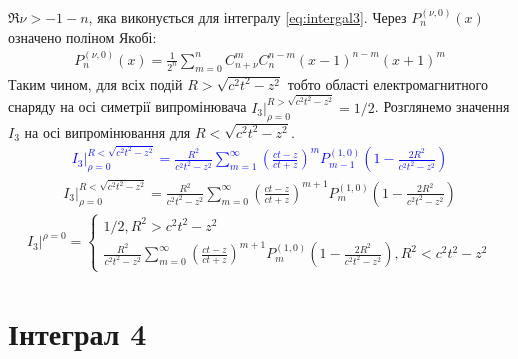 $ \Re \nu > - 1 - n $, яка виконується для інтегралу \eqref{eq:intergal3}. 
Через $ P_n^{(\nu,0)} (x) $ означено поліном Якобі:
%
\begin{equation*} \begin{aligned}
P_n^{(\nu,0)} (x) = \frac{1}{2^n} \sum_{m=0}^{n} C_{n+\nu}^{m} C_{n}^{n-m} 
\left( x - 1 \right)^{n-m} \left( x + 1 \right)^m 
\end{aligned} \end{equation*}
%
Таким чином, для всіх подій $ R > \sqrt{c^2 t^2 - z^2} $ тобто області 
електромагнитного снаряду на осі симетрії випромінювача 
$ \left. I_3 \right|_{\rho = 0}^{R > \sqrt{c^2 t^2 - z^2}} = 1/2 $. Розглянемо 
значення $ I_3 $ на осі випромінювання для $ R < \sqrt{c^2 t^2 - z^2} $.
%
\textcolor{blue}{ \begin{equation*} \begin{aligned}
\left. I_3 \right|_{\rho = 0}^{R < \sqrt{c^2 t^2 - z^2}} = 
\frac{R^2}{c^2 t^2 - z^2} \sum_{m=1}^{\infty} 
\left( \frac{ct - z}{ct + z} \right)^m P_{m-1}^{(1,0)} 
\left( 1 - \frac{2R^2}{c^2 t^2 - z^2} \right)
\end{aligned} \end{equation*} }
%
\begin{equation*} \begin{aligned}
\left. I_3 \right|_{\rho = 0}^{R < \sqrt{c^2 t^2 - z^2}} = 
\frac{R^2}{c^2 t^2 - z^2} \sum_{m=0}^{\infty} 
\left( \frac{ct - z}{ct + z} \right)^{m+1} P_{m}^{(1,0)} 
\left( 1 - \frac{2R^2}{c^2 t^2 - z^2} \right)
\end{aligned} \end{equation*}
%
\begin{equation} \begin{aligned} \label{eq:i3onaxis}
\left. I_3 \right|^{\rho = 0} = \begin{cases} 1/2, R^2 > c^2 t^2 - z^2 \\
\frac{R^2}{c^2 t^2 - z^2} \sum_{m=0}^{\infty} 
\left( \frac{ct - z}{ct + z} \right)^{m+1} P_{m}^{(1,0)} 
\left( 1 - \frac{2R^2}{c^2 t^2 - z^2} \right), 
R^2 < c^2 t^2 - z^2 \end{cases}
\end{aligned} \end{equation}

\section{Інтеграл 4}

